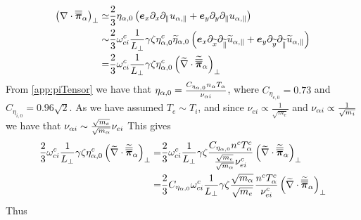 %
\begin{align*}
 \left(\nabla\cdot\boldsymbol{\overline{\overline{\pi}}}_\alpha\right)_\perp \simeq&
 \frac{2}{3}\eta_{\alpha,0}
 \left(
  \boldsymbol{e}_x\partial_x\partial_\|u_{\alpha,\|}
  +
  \boldsymbol{e}_y\partial_y\partial_\|u_{\alpha,\|}
 \right)
 \\
 \sim&
 \frac{2}{3}
  \omega^c_{ci}
  \frac{1}{L_\perp}
  \gamma
  \zeta
  \eta^c_{\alpha,0}
  \widetilde{ \eta}_{\alpha,0}
 \left(
  \boldsymbol{e}_x\partial_{\widetilde{ x}}\partial_{\widetilde{ \|}}\widetilde{ u}_{\alpha,\|} +
  \boldsymbol{e}_y\partial_{\widetilde{ y}}\partial_{\widetilde{ \|}}\widetilde{ u}_{\alpha,\|}
 \right)
 \\
 =&
 \frac{2}{3}
  \omega^c_{ci}
  \frac{1}{L_\perp}
  \gamma
  \zeta
  \eta^c_{\alpha,0}
 \left(\widetilde{ \nabla}\cdot\widetilde{ \boldsymbol{\overline{\overline{\pi}}}}_\alpha\right)_\perp
\end{align*}
%
From \cref{app:piTensor} we have that $\eta_{\alpha,0}=\frac{C_{\eta_{\alpha,0}}n_\alpha T_\alpha}{\nu_{\alpha i}}$, where $C_{\eta_{e,0}}=0.73$ and $C_{\eta_{i,0}}=0.96\sqrt{2}$.
As we have assumed $T_e \sim T_i$, and since $\nu_{e i}\propto \frac{1}{\sqrt{m_e}}$ and $\nu_{\alpha i}\propto \frac{1}{\sqrt{m_i}}$ we have that $\nu_{\alpha i}\sim \frac{\sqrt{m_e}}{\sqrt{m_\alpha}}\nu_{ei}$
This gives
%
\begin{align*}
 \frac{2}{3}
  \omega^c_{ci}
  \frac{1}{L_\perp}
  \gamma
  \zeta
  \eta^c_{\alpha,0}
 \left(\widetilde{ \nabla}\cdot\widetilde{ \boldsymbol{\overline{\overline{\pi}}}}_\alpha\right)_\perp
 =&
 \frac{2}{3}
  \omega^c_{ci}
  \frac{1}{L_\perp}
  \gamma
  \zeta
  \frac{C_{\eta_{\alpha,0}} n^c T^c_\alpha}{\frac{\sqrt{m_e}}{\sqrt{m_\alpha}}\nu^c_{ei}}
 \left(\widetilde{ \nabla}\cdot\widetilde{ \boldsymbol{\overline{\overline{\pi}}}}_\alpha\right)_\perp
 \\
 =&
 \frac{2}{3}
 C_{\eta_{\alpha,0}}
  \omega^c_{ci}
  \frac{1}{L_\perp}
  \gamma
  \zeta
  \frac{\sqrt{m_\alpha}}{\sqrt{m_e}}
  \frac{n^c T^c_\alpha}{\nu^c_{ei}}
 \left(\widetilde{ \nabla}\cdot\widetilde{ \boldsymbol{\overline{\overline{\pi}}}}_\alpha\right)_\perp
\end{align*}
%
Thus
%
